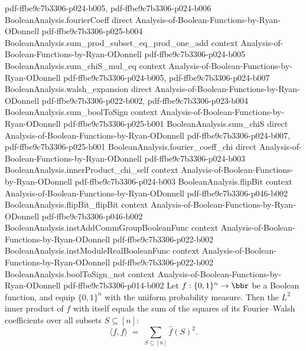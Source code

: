 \begin{theorem}
  {pdf-ffbe9c7b3306-p024-b005,
    pdf-ffbe9c7b3306-p024-b006}
\proofstep
  {BooleanAnalysis.fourierCoeff}
  {direct}
  {Analysis-of-Boolean-Functions-by-Ryan-ODonnell}
  {pdf-ffbe9c7b3306-p025-b004}
\proofstep
  {BooleanAnalysis.sum_prod_subset_eq_prod_one_add}
  {context}
  {Analysis-of-Boolean-Functions-by-Ryan-ODonnell}
  {pdf-ffbe9c7b3306-p024-b005}
\proofstep
  {BooleanAnalysis.sum_chiS_mul_eq}
  {context}
  {Analysis-of-Boolean-Functions-by-Ryan-ODonnell}
  {pdf-ffbe9c7b3306-p024-b005,
    pdf-ffbe9c7b3306-p024-b007}
\proofstep
  {BooleanAnalysis.walsh_expansion}
  {direct}
  {Analysis-of-Boolean-Functions-by-Ryan-ODonnell}
  {pdf-ffbe9c7b3306-p022-b002,
    pdf-ffbe9c7b3306-p023-b004}
\proofstep
  {BooleanAnalysis.sum_boolToSign}
  {context}
  {Analysis-of-Boolean-Functions-by-Ryan-ODonnell}
  {pdf-ffbe9c7b3306-p025-b001}
\proofstep
  {BooleanAnalysis.sum_chiS}
  {direct}
  {Analysis-of-Boolean-Functions-by-Ryan-ODonnell}
  {pdf-ffbe9c7b3306-p024-b007,
    pdf-ffbe9c7b3306-p025-b001}
\proofstep
  {BooleanAnalysis.fourier_coeff_chi}
  {direct}
  {Analysis-of-Boolean-Functions-by-Ryan-ODonnell}
  {pdf-ffbe9c7b3306-p024-b003}
\proofstep
  {BooleanAnalysis.innerProduct_chi_self}
  {context}
  {Analysis-of-Boolean-Functions-by-Ryan-ODonnell}
  {pdf-ffbe9c7b3306-p024-b003}
\proofstep
  {BooleanAnalysis.flipBit}
  {context}
  {Analysis-of-Boolean-Functions-by-Ryan-ODonnell}
  {pdf-ffbe9c7b3306-p046-b002}
\proofstep
  {BooleanAnalysis.flipBit_flipBit}
  {context}
  {Analysis-of-Boolean-Functions-by-Ryan-ODonnell}
  {pdf-ffbe9c7b3306-p046-b002}
\proofstep
  {BooleanAnalysis.instAddCommGroupBooleanFunc}
  {context}
  {Analysis-of-Boolean-Functions-by-Ryan-ODonnell}
  {pdf-ffbe9c7b3306-p022-b002}
\proofstep
  {BooleanAnalysis.instModuleRealBooleanFunc}
  {context}
  {Analysis-of-Boolean-Functions-by-Ryan-ODonnell}
  {pdf-ffbe9c7b3306-p022-b002}
\proofstep
  {BooleanAnalysis.boolToSign_not}
  {context}
  {Analysis-of-Boolean-Functions-by-Ryan-ODonnell}
  {pdf-ffbe9c7b3306-p014-b002}
Let $f : \{0,1\}^n \to \bbr$ be a Boolean function, and equip $\{0,1\}^n$ with the
uniform probability measure. Then the $L^2$ inner product of $f$ with itself equals the
sum of the squares of its Fourier--Walsh coefficients over all subsets $S \subseteq
[n]$:
\[
  \langle f, f\rangle \;=\; \sum_{S \subseteq [n]} \hat f(S)^2.
\]
\end{theorem}

